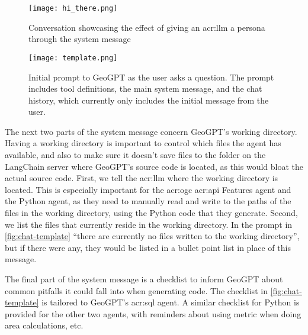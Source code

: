 \begin{figure}[H]
    \centering
    \texttt{[image: hi\_there.png]}
    \caption[LLM persona example]{Conversation showcasing the effect of giving an \acrshort{acr:llm} a persona through the system message}
    \label{fig:effect-of-system-message}
\end{figure}

\begin{figure}
    \centering
    \texttt{[image: template.png]}
    \caption[Initial prompt to GeoGPT as the user asks a question]{Initial prompt to GeoGPT as the user asks a question. The prompt includes tool definitions, the main system message, and the chat history, which currently only includes the initial message from the user.}
    \label{fig:chat-template}
\end{figure}

The next two parts of the system message concern GeoGPT's working directory. Having a working directory is important to control which files the agent has available, and also to make sure it doesn't save files to the folder on the LangChain server where GeoGPT's source code is located, as this would bloat the actual source code. First, we tell the \acrshort{acr:llm} where the working directory is located. This is especially important for the \acrshort{acr:ogc} \acrshort{acr:api} Features agent and the Python agent, as they need to manually read and write to the paths of the files in the working directory, using the Python code that they generate. Second, we list the files that currently reside in the working directory. In the prompt in \autoref{fig:chat-template} \enquote{there are currently no files written to the working directory}, but if there were any, they would be listed in a bullet point list in place of this message.

The final part of the system message is a checklist to inform GeoGPT about common pitfalls it could fall into when generating code. The checklist in \autoref{fig:chat-template} is tailored to GeoGPT's \acrshort{acr:sql} agent. A similar checklist for Python is provided for the other two agents, with reminders about using metric  when doing area calculations, etc.

